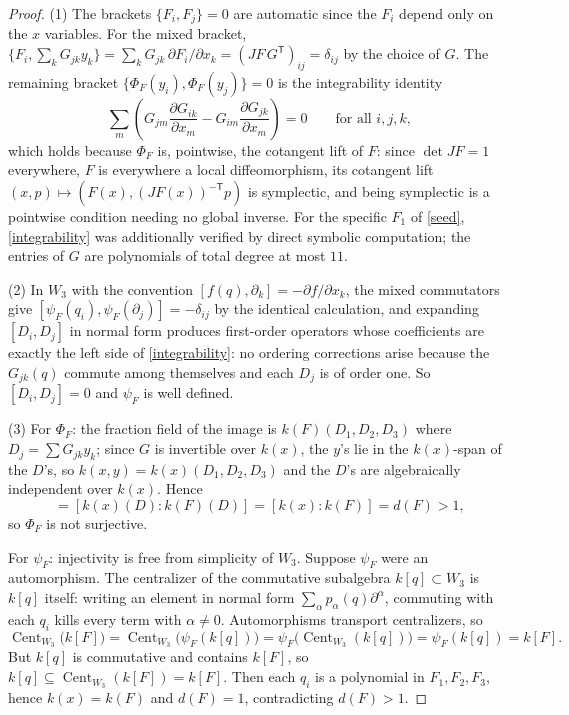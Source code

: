 \documentclass[11pt]{article}
\theoremstyle{change}
\theoremstyle{nonumberplain}
\newtheorem{proof}{Proof}
\numberwithin{equation}{section}
\DeclareMathOperator{\Cent}{Cent}
\DeclareMathOperator{\Frac}{Frac}
\begin{document}
\begin{proof}
(1) The brackets $\{F_i, F_j\} = 0$ are automatic since the $F_i$ depend only on the $x$ variables. For the mixed bracket, $\{F_i, \sum_k G_{jk} y_k\} = \sum_k G_{jk} \, \partial F_i / \partial x_k = (JF \, G^{\mathsf{T}})_{ij} = \delta_{ij}$ by the choice of $G$. The remaining bracket $\{\Phi_F(y_i), \Phi_F(y_j)\} = 0$ is the integrability identity
\begin{equation}\label{integrability}
\sum_m \left( G_{jm} \frac{\partial G_{ik}}{\partial x_m} - G_{im} \frac{\partial G_{jk}}{\partial x_m} \right) = 0 \qquad \text{for all } i,j,k,
\end{equation}
which holds because $\Phi_F$ is, pointwise, the cotangent lift of $F$: since $\det JF = 1$ everywhere, $F$ is everywhere a local diffeomorphism, its cotangent lift $(x, p) \mapsto (F(x), (JF(x))^{-\mathsf{T}} p)$ is symplectic, and being symplectic is a pointwise condition needing no global inverse. For the specific $F_1$ of \cref{seed}, \cref{integrability} was additionally verified by direct symbolic computation; the entries of $G$ are polynomials of total degree at most $11$.

(2) In $W_3$ with the convention $[f(q), \partial_k] = -\partial f/\partial x_k$, the mixed commutators give $[\psi_F(q_i), \psi_F(\partial_j)] = -\delta_{ij}$ by the identical calculation, and expanding $[D_i, D_j]$ in normal form produces first-order operators whose coefficients are exactly the left side of \cref{integrability}: no ordering corrections arise because the $G_{jk}(q)$ commute among themselves and each $D_j$ is of order one. So $[D_i, D_j] = 0$ and $\psi_F$ is well defined.

(3) For $\Phi_F$: the fraction field of the image is $k(F)(D_1, D_2, D_3)$ where $D_j = \sum G_{jk} y_k$; since $G$ is invertible over $k(x)$, the $y$'s lie in the $k(x)$-span of the $D$'s, so $k(x,y) = k(x)(D_1,D_2,D_3)$ and the $D$'s are algebraically independent over $k(x)$. Hence
\begin{equation*}
[k(x,y) : \Frac(\text{im}\, \Phi_F)] = [k(x)(D) : k(F)(D)] = [k(x) : k(F)] = d(F) > 1,
\end{equation*}
so $\Phi_F$ is not surjective.

For $\psi_F$: injectivity is free from simplicity of $W_3$. Suppose $\psi_F$ were an automorphism. The centralizer of the commutative subalgebra $k[q] \subset W_3$ is $k[q]$ itself: writing an element in normal form $\sum_\alpha p_\alpha(q) \partial^\alpha$, commuting with each $q_i$ kills every term with $\alpha \neq 0$. Automorphisms transport centralizers, so
\begin{equation*}
\Cent_{W_3}\big(k[F]\big) = \Cent_{W_3}\big(\psi_F(k[q])\big) = \psi_F\big(\Cent_{W_3}(k[q])\big) = \psi_F(k[q]) = k[F].
\end{equation*}
But $k[q]$ is commutative and contains $k[F]$, so $k[q] \subseteq \Cent_{W_3}(k[F]) = k[F]$. Then each $q_i$ is a polynomial in $F_1, F_2, F_3$, hence $k(x) = k(F)$ and $d(F) = 1$, contradicting $d(F) > 1$.
\end{proof}
\end{document}
